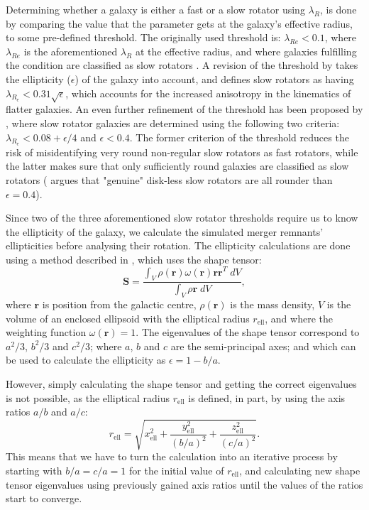 \documentclass[english, oneside]{HYgradu}
\begin{document}
Determining whether a galaxy is either a fast or a slow rotator using $\lambda_R$, is done by comparing the value that the parameter gets at the galaxy's effective radius, to some pre-defined threshold. The originally used threshold is: $\lambda_{Re} < 0.1$, where $\lambda_{Re}$ is the aforementioned $\lambda_R$ at the effective radius, and where galaxies fulfilling the condition are classified as slow rotators \citep{Emsellem2007}. A revision of the threshold by \cite{Emsellem2011} takes the ellipticity ($\epsilon$) of the galaxy into account, and defines slow rotators as having $\lambda_{R_e} < 0.31 \sqrt{\epsilon}$, which accounts for the increased anisotropy in the kinematics of flatter galaxies. An even further refinement of the threshold has been proposed by \cite{Cappellari2016}, where slow rotator galaxies are determined using the following two criteria: $\lambda_{R_e} < 0.08 + \epsilon/4$ and $\epsilon < 0.4$. The former criterion of the threshold reduces the risk of misidentifying very round non-regular slow rotators as fast rotators, while the latter makes sure that only sufficiently round galaxies are classified as slow rotators (\cite{Cappellari2016} argues that "genuine" disk-less slow rotators are all rounder than $\epsilon = 0.4$).

Since two of the three aforementioned slow rotator thresholds require us to know the ellipticity of the galaxy, we calculate the simulated merger remnants' ellipticities before analysing their rotation. The ellipticity calculations are done using a method described in \cite{Zemp2011}, which uses the shape tensor:
\begin{equation}
\mathbf{S} = \frac{\int_V \rho(\mathbf{r}) \omega(\mathbf{r}) \mathbf{r} \mathbf{r}^T \; dV }{\int_V \rho{\mathbf{r}} \; dV},
\end{equation}
where $\mathbf{r}$ is position from the galactic centre, $\rho(\mathbf{r})$ is the mass density, $V$ is the volume of an enclosed ellipsoid with the elliptical radius $r_\mathrm{ell}$, and where the weighting function $\omega(\mathbf{r}) = 1$. The eigenvalues of the shape tensor correspond to $a^2/3$, $b^2/3$ and $c^2/3$; where $a$, $b$ and $c$ are the semi-principal axes; and which can be used to calculate the ellipticity as $\epsilon = 1 - b/a$. 

However, simply calculating the shape tensor and getting the correct eigenvalues is not possible, as the elliptical radius $r_\mathrm{ell}$ is defined, in part, by using the axis ratios $a/b$ and $a/c$:
\begin{equation}
r_\mathrm{ell} = \sqrt{x_\mathrm{ell}^2 + \frac{y_\mathrm{ell}^2}{(b/a)^2} + \frac{z_\mathrm{ell}^2}{(c/a)^2}}.
\end{equation}
This means that we have to turn the calculation into an iterative process by starting with $b/a = c/a = 1$ for the initial value of $r_\mathrm{ell}$, and calculating new shape tensor eigenvalues using previously gained axis ratios until the values of the ratios start to converge. 
\end{document}
